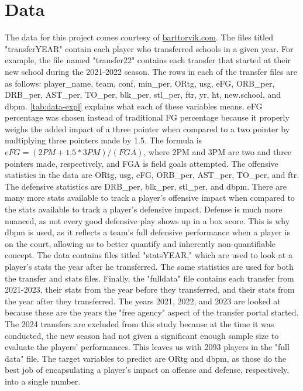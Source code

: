\documentclass[12pt]{article}
\begin{document}
\section{Data}
\label{sec:data}
The data for this project comes courtesy of \href{barttorvik.com}{barttorvik.com}. The files titled "transferYEAR" contain each player who transferred schools in a given year. For example, the file named "transfer22" contains each transfer that started at their new school during the 2021-2022 season. The rows in each of the transfer files are as follows: player\_name, team, conf, min\_per, ORtg, usg, eFG, ORB\_per, DRB\_per, AST\_per, TO\_per, blk\_per, stl\_per, ftr, yr, ht, new.school, and dbpm. \autoref{tab:data-expl} explains what each of these variables means. eFG percentage was chosen instead of traditional FG percentage because it properly weighs the added impact of a three pointer when compared to a two pointer by multiplying three pointers made by 1.5. The formula is \(eFG=(2PM+1.5*3PM)/(FGA)\), where 2PM and 3PM are two and three pointers made, respectively, and FGA is field goals attempted. The offensive statistics in the data are ORtg, usg, eFG, ORB\_per, AST\_per, TO\_per, and ftr. The defensive statistics are DRB\_per, blk\_per, stl\_per, and dbpm. There are many more stats available to track a player's offensive impact when compared to the stats available to track a player's defensive impact. Defense is much more nuanced, as not every good defensive play shows up in a box score. This is why dbpm is used, as it reflects a team's full defensive performance when a player is on the court, allowing us to better quantify and inherently non-quantifiable concept. The data contains files titled "statsYEAR," which are used to look at a player's stats the year after he transferred. The same statistics are used for both the transfer and stats files. Finally, the "fulldata" file contains each transfer from 2021-2023, their stats from the year before they transferred, and their stats from the year after they transferred. The years 2021, 2022, and 2023 are looked at because these are the years the "free agency" aspect of the transfer portal started. The 2024 transfers are excluded from this study because at the time it was conducted, the new season had not given a significant enough sample size to evaluate the players' performances. This leaves us with 2093 players in the "full data" file. The target variables to predict are ORtg and dbpm, as those do the best job of encapsulating a player's impact on offense and defense, respectively, into a single number.
\end{document}
